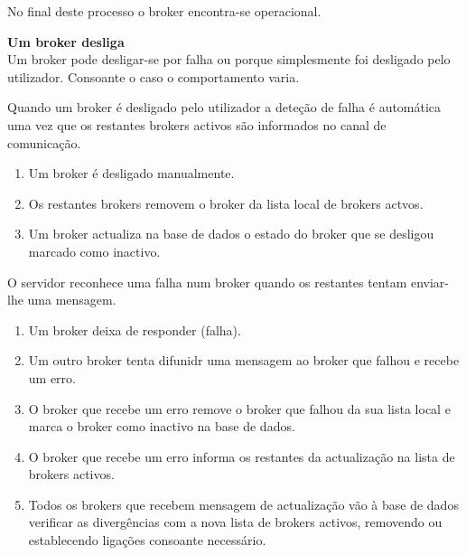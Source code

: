 No final deste processo o broker encontra-se operacional.

\hl{}

\textbf{Um broker desliga}\\
Um broker pode desligar-se por falha ou porque simplesmente foi desligado pelo utilizador. Consoante o caso o comportamento varia.

Quando um broker é desligado pelo utilizador a deteção de falha é automática uma vez que os restantes brokers activos são informados no canal de comunicação.

\begin{enumerate}
\item Um broker é desligado manualmente.
\item Os restantes brokers removem o broker da lista local de brokers actvos.
\item Um broker actualiza na base de dados o estado do broker que se desligou marcado como inactivo.
\end{enumerate}

O servidor reconhece uma falha num broker quando os restantes tentam enviar-lhe uma mensagem.

\begin{enumerate}
\item Um broker deixa de responder (falha).
\item Um outro broker tenta difunidr uma mensagem ao broker que falhou e recebe um erro.
\item O broker que recebe um erro remove o broker que falhou da sua lista local e marca o broker como inactivo na base de dados.
\item O broker que recebe um erro informa os restantes da actualização na lista de brokers activos.
\item Todos os brokers que recebem mensagem de actualização vão à base de dados verificar as divergências com a nova lista de brokers activos, removendo ou establecendo ligações consoante necessário.
\end{enumerate}


